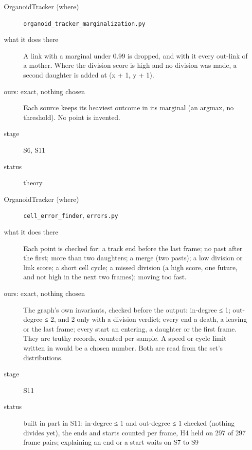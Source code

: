\begin{description}
\item[{OrganoidTracker (where)}] \texttt{organoid\_\allowbreak{}tracker\_\allowbreak{}marginalization.\allowbreak{}py}
\item[{what it does there}] A link with a marginal under 0.99 is dropped, and with it every out-link of a mother. Where the division score is high and no division was made, a second daughter is added at (x + 1, y + 1).
\item[{ours: exact, nothing chosen}] Each source keeps its heaviest outcome in its marginal (an argmax, no threshold). No point is invented.
\item[{stage}] S6, S11
\item[{status}] theory
\end{description}

\begin{description}
\item[{OrganoidTracker (where)}] \texttt{cell\_\allowbreak{}error\_\allowbreak{}finder}, \texttt{errors.\allowbreak{}py}
\item[{what it does there}] Each point is checked for: a track end before the last frame; no past after the first; more than two daughters; a merge (two pasts); a low division or link score; a short cell cycle; a missed division (a high score, one future, and not high in the next two frames); moving too fast.
\item[{ours: exact, nothing chosen}] The graph's own invariants, checked before the output: in-degree ≤ 1; out-degree ≤ 2, and 2 only with a division verdict; every end a death, a leaving or the last frame; every start an entering, a daughter or the first frame. They are truthy records, counted per sample. A speed or cycle limit written in would be a chosen number. Both are read from the set's distributions.
\item[{stage}] S11
\item[{status}] built in part in S11: in-degree ≤ 1 and out-degree ≤ 1 checked (nothing divides yet), the ends and starts counted per frame, H4 held on 297 of 297 frame pairs; explaining an end or a start waits on S7 to S9
\end{description}

